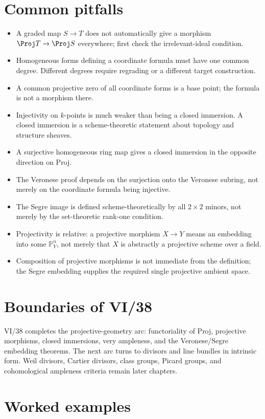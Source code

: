 \section{Common pitfalls}
\begin{itemize}
\item A graded map \(S\to T\) does not automatically give a morphism \(\Proj T\to\Proj S\) everywhere; first check the irrelevant-ideal condition.
\item Homogeneous forms defining a coordinate formula must have one common degree.  Different degrees require regrading or a different target construction.
\item A common projective zero of all coordinate forms is a base point; the formula is not a morphism there.
\item Injectivity on \(k\)-points is much weaker than being a closed immersion.  A closed immersion is a scheme-theoretic statement about topology and structure sheaves.
\item A surjective homogeneous ring map gives a closed immersion in the opposite direction on Proj.
\item The Veronese proof depends on the surjection onto the Veronese subring, not merely on the coordinate formula being injective.
\item The Segre image is defined scheme-theoretically by all \(2\times2\) minors, not merely by the set-theoretic rank-one condition.
\item Projectivity is relative: a projective morphism \(X\to Y\) means an embedding into some \(\mathbb P^n_Y\), not merely that \(X\) is abstractly a projective scheme over a field.
\item Composition of projective morphisms is not immediate from the definition; the Segre embedding supplies the required single projective ambient space.
\end{itemize}

\section{Boundaries of VI/38}
VI/38 completes the projective-geometry arc: functoriality of Proj, projective morphisms, closed immersions, very ampleness, and the Veronese/Segre embedding theorems.  The next arc turns to divisors and line bundles in intrinsic form.  Weil divisors, Cartier divisors, class groups, Picard groups, and cohomological ampleness criteria remain later chapters.

\section{Worked examples}


